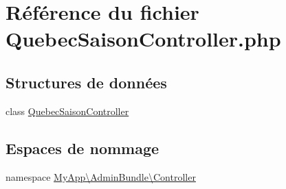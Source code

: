 \hypertarget{_quebec_saison_controller_8php}{\section{Référence du fichier Quebec\-Saison\-Controller.\-php}
\label{_quebec_saison_controller_8php}
}
\subsection*{Structures de données}
\begin{DoxyCompactItemize}
\item 
class \hyperlink{class_my_app_1_1_admin_bundle_1_1_controller_1_1_quebec_saison_controller}{Quebec\-Saison\-Controller}
\end{DoxyCompactItemize}
\subsection*{Espaces de nommage}
\begin{DoxyCompactItemize}
\item 
namespace \hyperlink{namespace_my_app_1_1_admin_bundle_1_1_controller}{My\-App\textbackslash{}\-Admin\-Bundle\textbackslash{}\-Controller}
\end{DoxyCompactItemize}
